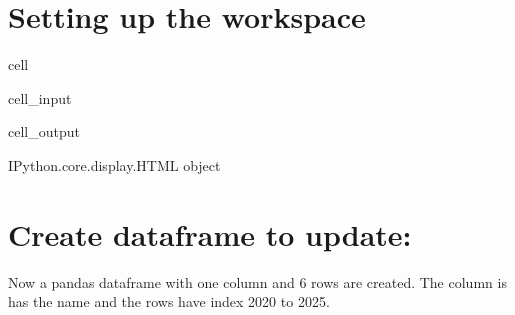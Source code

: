 \documentclass[letterpaper,10pt,english]{jupyterBook}
\begin{document}
\section{Setting up the workspace}
\label{\detokenize{content/howto/update/model update:setting-up-the-workspace}}
\begin{sphinxuseclass}{cell}\begin{sphinxVerbatimInput}

\begin{sphinxuseclass}{cell_input}
\begin{sphinxVerbatim}[commandchars=\\\{\}]
   

    
\end{sphinxVerbatim}

\end{sphinxuseclass}\end{sphinxVerbatimInput}
\begin{sphinxVerbatimOutput}

\begin{sphinxuseclass}{cell_output}
\begin{sphinxVerbatim}[commandchars=\\\{\}]
\PYGZlt{}IPython.core.display.HTML object\PYGZgt{}
\end{sphinxVerbatim}

\end{sphinxuseclass}\end{sphinxVerbatimOutput}

\end{sphinxuseclass}

\section{Create dataframe to update:}
\label{\detokenize{content/howto/update/model update:create-dataframe-to-update}}
\sphinxAtStartPar
Now a pandas dataframe with one column and 6 rows are created. The column is has the name  and the rows have index 2020 to 2025.
\end{document}

